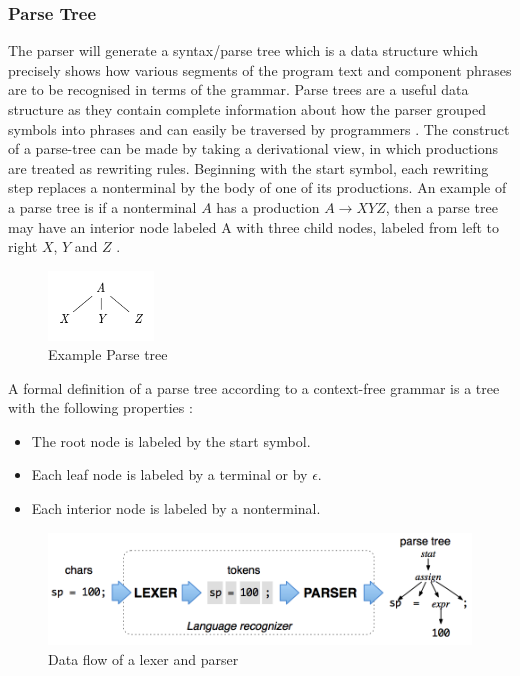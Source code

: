 \subsubsection{Parse Tree}

The parser will generate a syntax/parse tree which is a data structure which precisely shows how various segments of the program text and component phrases are to be recognised in terms of the grammar. Parse trees are a useful data structure as they contain complete information about how the parser grouped symbols into phrases and can easily be traversed by programmers \cite{parr2013definitive}. The construct of a parse-tree can be made by taking a  derivational view, in which productions are treated as rewriting rules. Beginning with the start symbol, each rewriting step replaces a nonterminal by the body of one of its productions. An example of a parse tree is if a nonterminal $A$ has a production $A \rightarrow XYZ$, then a parse tree may have an interior node labeled A with three child nodes, labeled from left to right $X$, $Y$ and $Z$ \cite{aho2003compilers}. 

\begin{figure}[H]
  \centering
  \includegraphics[width=0.25\textwidth]{images/parse-tree2.PNG}
  \caption{Example Parse tree \cite{aho2003compilers}}
\end{figure}

A formal definition of a parse tree according to a context-free grammar is a tree with the following properties \cite{aho2003compilers}:
\begin{itemize}
    \item The root node is labeled by the start symbol.
    \item Each leaf node is labeled by a terminal or by $\epsilon$.
    \item Each interior node is labeled by a nonterminal.
\end{itemize}

\begin{figure}[H]
  \centering
  \includegraphics[width=1\textwidth]{images/antlr2.png}
  \caption{Data flow of a lexer and parser \cite{parr2013definitive}}
\end{figure}

